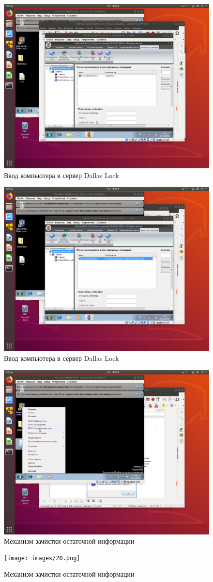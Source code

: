 \begin{figure}[H]
	\centering
	\includegraphics[width=.8\textwidth]{images/17.png}
	\caption{Ввод компьютера в сервер Dallas Lock}
\end{figure}

\begin{figure}[H]
	\centering
	\includegraphics[width=.8\textwidth]{images/18.png}
	\caption{Ввод компьютера в сервер Dallas Lock}
\end{figure}

\begin{figure}[H]
	\centering
	\includegraphics[width=.8\textwidth]{images/19.png}
	\caption{Механизм зачистки остаточной информации}
\end{figure}

\begin{figure}[H]
	\centering
	\texttt{[image: images/20.png]}
	\caption{Механизм зачистки остаточной информации}
\end{figure}
